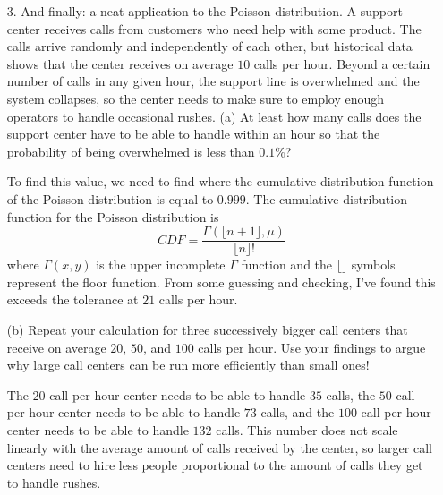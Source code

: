 \documentclass[a4paper,twoside]{article}
\begin{document}
\begin{itemize}
    \item[3.] And finally: a neat application to the Poisson distribution. A support center receives calls from customers who need help with some product. The calls arrive randomly and independently of each other, but historical data shows that the center receives on average $ 10 $ calls per hour. Beyond a certain number of calls in any given hour, the support line is overwhelmed and the system collapses, so the center needs to make sure to employ enough operators to handle occasional rushes.
        \subitem(a) At least how many calls does the support center have to be able to handle within an hour so that the probability of being overwhelmed is less than $ 0.1\% $?
        \begin{problem}
            To find this value, we need to find where the cumulative distribution function of the Poisson distribution is equal to $ 0.999 $. The cumulative distribution function for the Poisson distribution is
            \begin{equation}
                CDF = \frac{\Gamma(\lfloor n+1\rfloor, \mu)}{\lfloor n\rfloor!}
            \end{equation}
            where $ \Gamma(x,y) $ is the upper incomplete $\Gamma$ function and the $ \lfloor\rfloor $ symbols represent the floor function. From some guessing and checking, I've found this exceeds the tolerance at $ 21 $ calls per hour.
        \end{problem}
        \subitem(b) Repeat your calculation for three successively bigger call centers that receive on average $ 20 $, $ 50 $, and $ 100 $ calls per hour. Use your findings to argue why large call centers can be run more efficiently than small ones!
        \begin{problem}
            The $ 20 $ call-per-hour center needs to be able to handle $ 35 $ calls, the $ 50 $ call-per-hour center needs to be able to handle $ 73 $ calls, and the $ 100 $ call-per-hour center needs to be able to handle $ 132 $ calls. This number does not scale linearly with the average amount of calls received by the center, so larger call centers need to hire less people proportional to the amount of calls they get to handle rushes.
        \end{problem}
\end{itemize}
\end{document}
